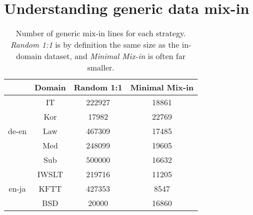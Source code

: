 \documentclass[11pt]{article}
\begin{document}
\section{Understanding generic data mix-in}

\begin{table}
    \centering
    \small
    \begin{tabular}{c|c|cc}
&  Domain  &  Random 1:1 & Minimal Mix-in\\
\hline
 \multirow{5}{*}{de-en}  &     IT & 222927  & 18861 \\%
   &     Kor & 17982   & 22769\\%
    &    Law & 467309  & 17485 \\%
     &   Med  & 248099 & 19605 \\%
     &   Sub & 500000  & 16632\\%
     \hline
 \multirow{3}{*}{en-ja}  &     IWSLT &219716 & 11205 \\%
    &    KFTT & 427353 & 8547 \\%
    & BSD & 20000 & 16860 \\%
      \end{tabular}
    \caption{Number of generic mix-in lines for each strategy.  \emph{Random 1:1} is by definition the same size as the in-domain dataset, and \emph{Minimal Mix-in} is often far smaller.}
    \label{tab:mixindatasets}
\end{table}
\end{document}
